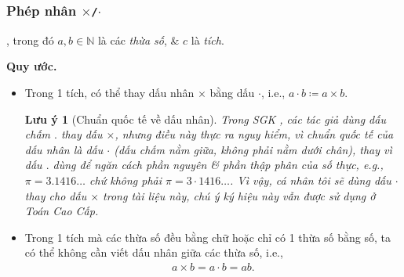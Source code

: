 \documentclass{article}
\numberwithin{equation}{section}
\newtheorem{remark}{Lưu ý}[section]
\begin{document}
\subsubsection{Phép nhân $\times$\texttt{/}$\cdot$}
, trong đó $a,b\in\mathbb{N}$ là các \textit{thừa số}, \& $c$ là \textit{tích}.

\noindent\textbf{Quy ước.}
\begin{itemize}
	\item Trong 1 tích, có thể thay dấu nhân $\times$ bằng dấu $\cdot$, i.e., $a\cdot b\coloneqq a\times b$.
	
	\begin{remark}[Chuẩn quốc tế về dấu nhân]
		Trong SGK \cite[p. 18]{Thai_Anh_Dat_Ha_Loan_Nam_Quang_Toan_6_tap_1}, các tác giả dùng dấu chấm $.$ thay dấu $\times$, nhưng điều này thực ra nguy hiểm, vì chuẩn quốc tế của dấu nhân là dấu $\cdot$ (dấu chấm nằm giữa, không phải nằm dưới chân), thay vì dấu $.$ dùng để ngăn cách phần nguyên \& phần thập phân của số thực, e.g., $\pi = 3.1416\ldots$ chứ không phải $\pi = 3\cdot 1416\ldots$. Vì vậy, cá nhân tôi sẽ dùng dấu $\cdot$ thay cho dấu $\times$ trong tài liệu này, chú ý ký hiệu này vẫn được sử dụng ở Toán Cao Cấp.
	\end{remark}
	\item Trong 1 tích mà các thừa số đều bằng chữ hoặc chỉ có 1 thừa số bằng số, ta có thể không cần viết dấu nhân giữa các thừa số, i.e.,
	\begin{align*}
		a\times b = a\cdot b = ab.
	\end{align*}
\end{itemize}
\end{document}
